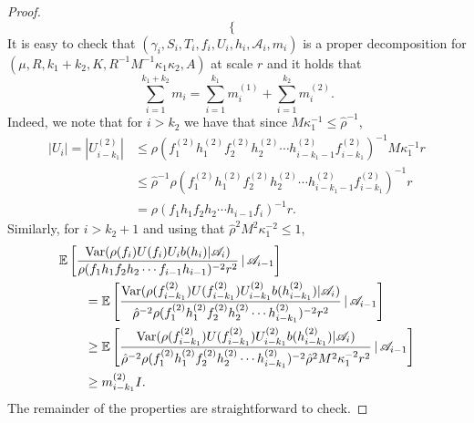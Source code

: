 \documentclass[10pt,a4paper]{amsart}
\DeclareMathOperator{\var}{Var}
\newcommand{\E}{\mathbb{E}}
\begin{document}
\begin{proof}
\begin{equation*}
\begin{cases}
        \end{cases}
    \end{equation*}
    It is easy to check that $\left(\gamma_i, S_i, T_i, f_i, U_i, h_i, \mathscr{A}_i, m_i\right)$ is a proper decomposition for $(\mu, R, k_1 + k_2, K, R^{-1} M^{-1} \kappa_1 \kappa_2, A)$ at scale $r$ and it holds that $$\sum_{i=1}^{k_1+k_2} m_i = \sum_{i=1}^{k_1} m_i^{(1)} + \sum_{i=1}^{k_2} m_i^{(2)}.$$ Indeed, we note that for $i > k_2$ we have that since $M\kappa_1^{-1} \leq \hat{\rho}^{-1}$,
    \begin{align*}
        |U_i| = |U_{i-k_1}^{(2)}| &\leq \rho(f_1^{(2)}h_1^{(2)}f_2^{(2)}h_2^{(2)}\cdots h_{i-k_1 -1}^{(2)} f_{i-k_1}^{(2)})^{-1} M\kappa_1^{-1}r \\
        &\leq \hat{\rho}^{-1}\rho(f_1^{(2)}h_1^{(2)}f_2^{(2)}h_2^{(2)}\cdots h_{i-k_1 -1}^{(2)} f_{i-k_1}^{(2)})^{-1} r \\
        &= \rho(f_1h_1f_2h_2\cdots h_{i-1} f_{i})^{-1}r.
    \end{align*}
    Similarly, for $i > k_2 + 1$ and using that $\hat{\rho}^2M^2\kappa_1^{-2} \leq 1$,
    \begin{align*}
        \MoveEqLeft \E\left[   \frac{\var(\rho(f_i) U(f_i) U_i b(h_i)|\mathscr{A}_i)}{\rho(f_1h_1 f_2h_2 \cdots f_{i-1}h_{i-1})^{-2} r^2} \,|\, \mathscr{A}_{i-1}  \right] \\
        &= \E\left[   \frac{\var(\rho(f^{(2)}_{i -k_1}) U(f^{(2)}_{i -k_1}) U^{(2)}_{i-k_1} b(h^{(2)}_{i - k_1})|\mathscr{A}_i)}{\hat{\rho}^{-2}\rho(f_1^{(2)}h_1^{(2)}f_2^{(2)}h_2^{(2)}\cdots h_{i-k_1}^{(2)})^{-2} r^2} \,|\, \mathscr{A}_{i-1}  \right] \\
        &\geq  \E\left[   \frac{\var(\rho(f^{(2)}_{i -k_1}) U(f^{(2)}_{i -k_1}) U^{(2)}_{i-k_1} b(h^{(2)}_{i - k_1})|\mathscr{A}_i)}{\hat{\rho}^{-2}\rho(f_1^{(2)}h_1^{(2)}f_2^{(2)}h_2^{(2)}\cdots h_{i-k_1}^{(2)})^{-2} \hat{\rho}^2 M^2 \kappa_1^{-2} r^2} \,|\, \mathscr{A}_{i-1}  \right] \\
        &\geq m_{i - k_1}^{(2)}I.
    \end{align*} The remainder of the properties are straightforward to check. 
\end{proof}
\end{document}
